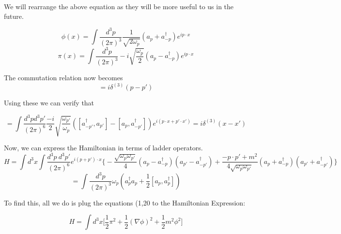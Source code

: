 \documentclass{article}
\newcommand{\A}{a^\dagger}
\begin{document}
We will rearrange the above equation as they will be more useful to us in the future.

\begin{equation}
    \phi(x) = \int \frac{d^3 p }{(2\pi)^3} \frac{1}{\sqrt{2\omega_p}}(a_p  + \A_{-p})e^{ip\cdot x}
\end{equation}
\begin{equation}
    \pi(x) = \int \frac{d^3 p }{(2\pi)^3} -i\sqrt{\frac{\omega_p}{2}}(a_p - \A_{-p})e^{ip\cdot x}
\end{equation}

The commutation relation now becomes
\begin{equation}
    [a_p, \A_{p'}] = i\delta^{(3)}(p-p')
\end{equation}




Using these we can verify that

\begin{equation}
    [\phi(x),\pi(x')] = \int \frac{d^3 p d^3 p'}{(2\pi)^6} \frac{-i}{2} \sqrt{\frac{\omega_{p'}}{\omega_p}} ([\A_{-p'},a_{p'}] - [a_p, \A_{-p'}]) e^{i(p\cdot x + p' \cdot x')} = i\delta^{(3)}(x-x')
\end{equation}

Now, we can express the Hamiltonian in terms of ladder operators.
\begin{equation}
    H = \int d^3 x \int \frac{d^3 p\ d^3p'}{(2\pi)^6}e^{i(p+p')\cdot x} \bigg\{  -\frac{ \sqrt{\omega_p \omega_{p'}}}{4} (a_p - \A_{-p})(a_{p'} - \A_{-p'}) + \frac{-p \cdot p' + m^2}{4\sqrt{\omega_p\omega_{p'}}}(a_p + \A_{-p})(a_{p'} + \A_{-p'})              \bigg\} 
\end{equation}
\begin{equation}
    =\int\frac{d^3 p }{(2\pi)^3}\omega_p(\A_p a_p +   \frac{1}{2}[a_p, \A_{p}])
\end{equation}

To find this, all we do is plug the equations (1,20 to the Hamiltonian Expression:

\begin{equation}
    H = \int d^3 x \bigg[\frac{1}{2}\pi^2 + \frac{1}{2}(\nabla \phi)^2 +\frac{1}{2}m^2\phi^2 \bigg]
\end{equation}
\end{document}
